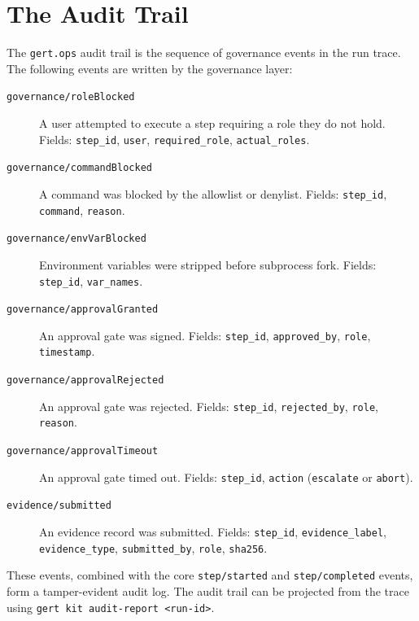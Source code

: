 \section{The Audit Trail}
\label{sec:governance-audit-trail}

The \texttt{gert.ops} audit trail is the sequence of governance events in the run trace.
The following events are written by the governance layer:

\begin{description}
  \item[\texttt{governance/roleBlocked}] A user attempted to execute a step requiring a role
    they do not hold. Fields: \texttt{step\_id}, \texttt{user}, \texttt{required\_role},
    \texttt{actual\_roles}.
  \item[\texttt{governance/commandBlocked}] A command was blocked by the allowlist or
    denylist. Fields: \texttt{step\_id}, \texttt{command}, \texttt{reason}.
  \item[\texttt{governance/envVarBlocked}] Environment variables were stripped before
    subprocess fork. Fields: \texttt{step\_id}, \texttt{var\_names}.
  \item[\texttt{governance/approvalGranted}] An approval gate was signed. Fields:
    \texttt{step\_id}, \texttt{approved\_by}, \texttt{role}, \texttt{timestamp}.
  \item[\texttt{governance/approvalRejected}] An approval gate was rejected. Fields:
    \texttt{step\_id}, \texttt{rejected\_by}, \texttt{role}, \texttt{reason}.
  \item[\texttt{governance/approvalTimeout}] An approval gate timed out. Fields:
    \texttt{step\_id}, \texttt{action} (\texttt{escalate} or \texttt{abort}).
  \item[\texttt{evidence/submitted}] An evidence record was submitted. Fields:
    \texttt{step\_id}, \texttt{evidence\_label}, \texttt{evidence\_type},
    \texttt{submitted\_by}, \texttt{role}, \texttt{sha256}.
\end{description}

These events, combined with the core \texttt{step/started} and \texttt{step/completed}
events, form a tamper-evident audit log. The audit trail can be projected from the trace
using \texttt{gert kit audit-report <run-id>}.

